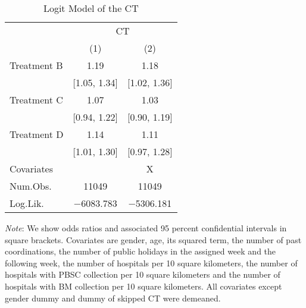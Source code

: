 \documentclass[12pt, a4paper]{article}
\begin{document}
\begin{table}[H]

\caption{\label{tab:logit-test}Logit Model of the CT}
\centering
\fontsize{8}{10}\selectfont
\begin{threeparttable}
\begin{tabular}[t]{>{\raggedright\arraybackslash}p{20em}cc}
\toprule
\multicolumn{1}{c}{ } & \multicolumn{2}{c}{CT} \\
\cmidrule(l{3pt}r{3pt}){2-3}
  & (1) & (2)\\
\midrule
Treatment B & \num{1.19} & \num{1.18}\\
 & {}[\num{1.05}, \num{1.34}] & {}[\num{1.02}, \num{1.36}]\\
Treatment C & \num{1.07} & \num{1.03}\\
 & {}[\num{0.94}, \num{1.22}] & {}[\num{0.90}, \num{1.19}]\\
Treatment D & \num{1.14} & \num{1.11}\\
 & {}[\num{1.01}, \num{1.30}] & {}[\num{0.97}, \num{1.28}]\\
\midrule
Covariates &  & X\\
Num.Obs. & \num{11049} & \num{11049}\\
Log.Lik. & \num{-6083.783} & \num{-5306.181}\\
\bottomrule
\end{tabular}
\begin{tablenotes}
\item \emph{Note}: We show odds ratios and associated 95 percent confidential intervals in square brackets. Covariates are gender, age, its squared term, the number of past coordinations, the number of public holidays in the assigned week and the following week, the number of hospitals per 10 square kilometers, the number of hospitals with PBSC collection per 10 square kilometers and the number of hospitals with BM collection per 10 square kilometers. All covariates except gender dummy and dummy of skipped CT were demeaned.
\end{tablenotes}
\end{threeparttable}
\end{table}
\end{document}
